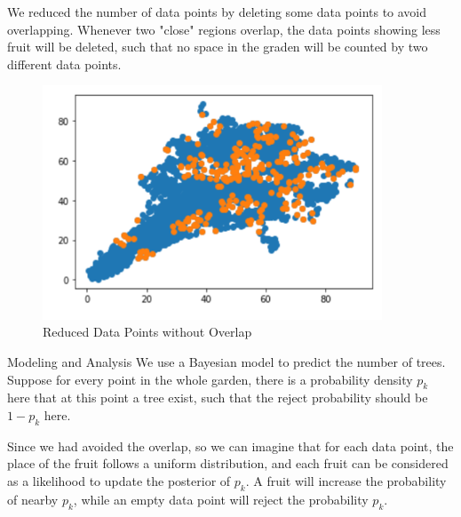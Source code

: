 \documentclass[final]{beamer}
\begin{document}
\begin{frame}
\begin{columns}[t]
\begin{column}{\colwidth}
\begin{tcolorbox}[width=\colwidth,height=\contentheight,top=.2in]
\begin{block}{}
We reduced the number of data points by deleting some data points to avoid overlapping. Whenever two "close" regions overlap, the data points showing less fruit will be deleted, such that no space in the graden will be counted by two different data points.

\vspace{.2in}

\begin{figure}[H]
\includegraphics[width=0.9\textwidth]{data_points_cleaned}
\caption{Reduced Data Points without Overlap}
\end{figure}


\end{block}

\vspace{-.5in}

\begin{block}{Modeling and Analysis}
We use a Bayesian model to predict the number of trees. Suppose for every point in the whole garden, there is a probability density $p_k$ here that at this point a tree exist, such that the reject probability should be $1-p_k$ here.

\vspace{0.2in}

Since we had avoided the overlap, so we can imagine that for each data point, the place of the fruit follows a uniform distribution, and each fruit can be considered as a likelihood to update the posterior of $p_k$. A fruit will increase the probability of nearby $p_k$, while an empty data point will reject the probability $p_k$. 

\end{block}

\end{tcolorbox}
\end{column}


\end{columns}
\end{frame}
\end{document}
